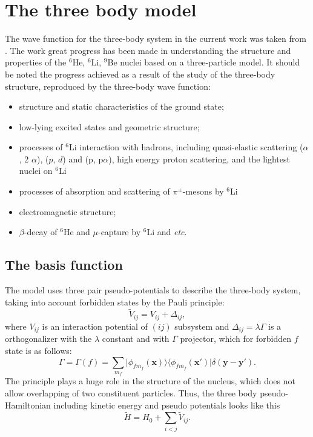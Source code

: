 \documentclass[
12pt, %
oneside, %
english, %
onehalfspacing, %
onehalfspacing, %
headsepline, %
]{MastersDoctoralThesis} %
\begin{document}
\chapter{The three body model}
The wave function for the three-body system in the current work was taken from \cite{kukulin1977stochastic}. The work \cite{kukulin1977stochastic} great progress has been made in understanding the structure and properties of the $^6$He, $^6$Li, $^9$Be nuclei based on a three-particle model. It should be noted the progress achieved as a result of the study of the three-body structure, reproduced by the three-body wave function:
\begin{itemize}
\item  structure and static characteristics of the ground state;
\item low-lying excited states and geometric structure;
\item processes of $^6$Li interaction with hadrons, including quasi-elastic scattering ($ \alpha $, 2 $\alpha $), ($ p $, $ d $) and (p, p$\alpha$), high energy proton scattering, and the lightest nuclei on $^6$Li
\item processes of absorption and scattering of $\pi^{\pm}$-mesons by $^6$Li
\item electromagnetic structure;
\item $\beta$-decay of $^6$He and $\mu$-capture by $^6$Li and \textit{etc}.
\end{itemize}

\section{The basis function}
The model \cite{kukulin1977stochastic} uses three pair pseudo-potentials to describe the three-body system, taking into account forbidden states by the Pauli principle:
\begin{equation}
\label{pseudopot}
\widetilde{V}_{ij}=V_{ij}+\Delta_{ij},
\end{equation}
where $V_{ij}$ is  an interaction potential of $(ij)$ subsystem and $\Delta_{ij}=\lambda \Gamma$ is a orthogonalizer with the $\lambda$ constant and with $\Gamma$ projector, which  for  forbidden $f$ state is as follows:
\begin{equation}
\label{projector}
\Gamma=\Gamma(f)=\sum\limits_{m_f}\vert \phi_{fm_f} ({\mathbf x})\rangle \langle  \phi_{fm_f} ({\mathbf x'}) \vert \delta({\mathbf y - \mathbf y'}).
\end{equation}
The principle plays a huge role in the structure of the nucleus, which does not allow overlapping of two constituent particles. Thus, the three body pseudo-Hamiltonian including kinetic energy and pseudo potentials looks like this
\begin{equation}
\label{pseudohamiltonian}
\widetilde{H}=H_0+\sum_{i < j} \widetilde{V }_{ij}.
\end{equation}
\end{document}
